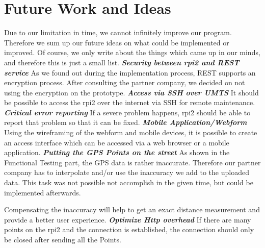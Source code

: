 \chapter{Future Work and Ideas}
Due to our limitation in time, we cannot infinitely improve our program. Therefore we sum up our future ideas on what could be implemented or improved. Of course, we only write about the things which came up in our minds, and therefore this is just a small list.
\newline \newline
\textbf{\textit{Security between \gls{rpi2} and REST service}} \newline
As we found out during the implementation process, REST supports an encryption process. After consulting the partner company, we decided on not using the encryption on the prototype.
\newline \newline
\textbf{\textit{Access via SSH over UMTS}}
\newline
It should be possible to access the \gls{rpi2} over the internet via SSH for remote maintenance.
\newline \newline
\textbf{\textit{Critical error reporting}}
\newline
If a severe problem happens, \gls{rpi2} should be able to report that problem so that it can be fixed.
\newline \newline
\textbf{\textit{Mobile Application/Webform}}
\newline
Using the wireframing of the webform and mobile devices, it is possible to create an access interface which can be accessed via a web browser or a mobile application.
\newline \newline
\textbf{\textit{Putting the GPS Points on the street}}
\newline
As shown in the Functional Testing part, the GPS data is rather inaccurate. Therefore our partner company has to interpolate and/or use the inaccuracy we add to the uploaded data. This task was not possible not accomplish in the given time, but could be implemented afterwards.

Compensating the inaccuracy will help to get an exact distance measurement and provide a better user experience.
\newline \newline
\textbf{\textit{Optimize Http overhead}}
\newline
If there are many points on the \gls{rpi2}  and the connection is established, the connection should only be closed after sending all the Points.
